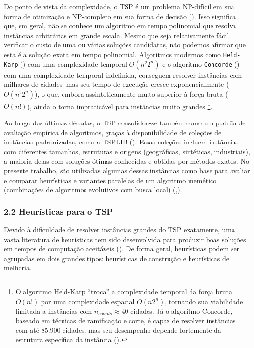 Do ponto de vista da complexidade, o TSP é um problema NP-difícil em sua
forma de otimização e NP-completo em sua forma de decisão
(). Isso significa que, em geral, não
se conhece um algoritmo em tempo polinomial que resolva instâncias
arbitrárias em grande escala. Mesmo que seja relativamente fácil
verificar o custo de uma ou várias soluções candidatas, não podemos
afirmar que esta é a solução exata em tempo polinomial. Algoritmos
modernos como \texttt{Held-Karp} ()
com uma complexidade temporal \(O(n^2 2^n)\) e o algoritmo
\texttt{Concorde} () com uma
complexidade temporal indefinida, conseguem resolver instâncias com
milhares de cidades, mas seu tempo de execução cresce exponencialmente
(\(O(n^2 2^n)\)), o que, embora assintoticamente muito superior à força
bruta (\(O(n!)\)), ainda o torna impraticável para instâncias muito
grandes \footnote{O algoritmo Held-Karp ``troca'' a complexidade
  temporal da força bruta \(O(n!)\) por uma complexidade espacial
  \(O(n 2^n)\), tornando sua viabilidade limitada a instâncias com
  \(n_{coords} \approx 40\) cidades. Já o algoritmo Concorde, baseado em
  técnicas de ramificação e corte, é capaz de resolver instâncias com
  até 85.900 cidades, mas seu desempenho depende fortemente da estrutura
  específica da instância ().}.

Ao longo das últimas décadas, o TSP consolidou-se também como um padrão
de avaliação empírica de algoritmos, graças à disponibilidade de
coleções de instâncias padronizadas, como a TSPLIB
(). Essas coleções incluem
instâncias com diferentes tamanhos, estruturas e origens (geográficas,
sintéticas, industriais), a maioria delas com soluções ótimas conhecidas
e obtidas por métodos exatos. No presente trabalho, são utilizadas
algumas dessas instâncias como base para avaliar e comparar heurísticas
e variantes paralelas de um algoritmo memético (combinações de
algoritmos evolutivos com busca local)
(,).

\subsubsection{2.2 Heurísticas para o TSP}\label{sec-22-heuristicas-tsp}

Devido à dificuldade de resolver instâncias grandes do TSP exatamente,
uma vasta literatura de heurísticas tem sido desenvolvida para produzir
boas soluções em tempos de computação aceitáveis
(). De forma geral, heurísticas podem
ser agrupadas em dois grandes tipos: heurísticas de construção e
heurísticas de melhoria.

